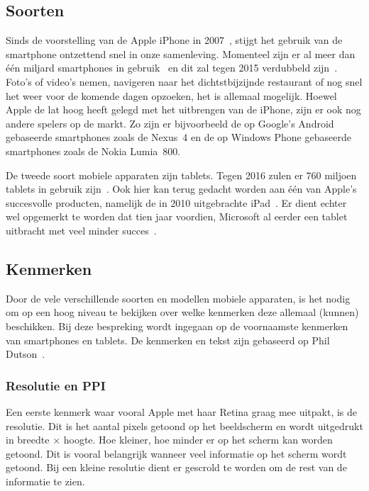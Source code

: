 \subsection{Soorten}
Sinds de voorstelling van de Apple iPhone in 2007~\cite{David2011}, stijgt het gebruik van de smartphone ontzettend snel in onze samenleving.  
Momenteel zijn er al meer dan één miljard smartphones in gebruik~\cite{Yang2012} en dit zal tegen 2015 verdubbeld zijn~\cite{Gillett2012}.
Foto's of video's nemen, navigeren naar het dichtstbijzijnde restaurant of nog snel het weer voor de komende dagen opzoeken, het is allemaal mogelijk. 
Hoewel Apple de lat hoog heeft gelegd met het uitbrengen van de iPhone, zijn er ook nog andere spelers op de markt. 
Zo zijn er bijvoorbeeld de op Google's Android gebaseerde smartphones zoals de Nexus~4 en de op Windows Phone gebaseerde smartphones zoals de Nokia Lumia~800.

De tweede soort mobiele apparaten zijn tablets.
Tegen 2016 zulen er 760 miljoen tablets in gebruik zijn~\cite{Gillett2012}.
Ook hier kan terug gedacht worden aan één van Apple's succesvolle producten, namelijk de in 2010 uitgebrachte iPad~\cite{Apple2010}. 
Er dient echter wel opgemerkt te worden dat tien jaar voordien, Microsoft al eerder een tablet uitbracht met veel minder succes~\cite{Microsoft2000}.

\subsection{Kenmerken}
Door de vele verschillende soorten en modellen mobiele apparaten, is het nodig om op een hoog niveau te bekijken over welke kenmerken deze allemaal (kunnen) beschikken. 
Bij deze bespreking wordt ingegaan op de voornaamste kenmerken van smartphones en tablets. 
De kenmerken en tekst zijn gebaseerd op Phil Dutson~\cite{PhilDutson2012}.

\subsubsection{Resolutie en PPI}
Een eerste kenmerk waar vooral Apple met haar Retina graag mee uitpakt, is de resolutie. 
Dit is het aantal pixels getoond op het beeldscherm en wordt uitgedrukt in breedte $\times$ hoogte. 
Hoe kleiner, hoe minder er op het scherm kan worden getoond. 
Dit is vooral belangrijk wanneer veel informatie op het scherm wordt getoond. 
Bij een kleine resolutie dient er gescrold te worden om de rest van de informatie te zien.


